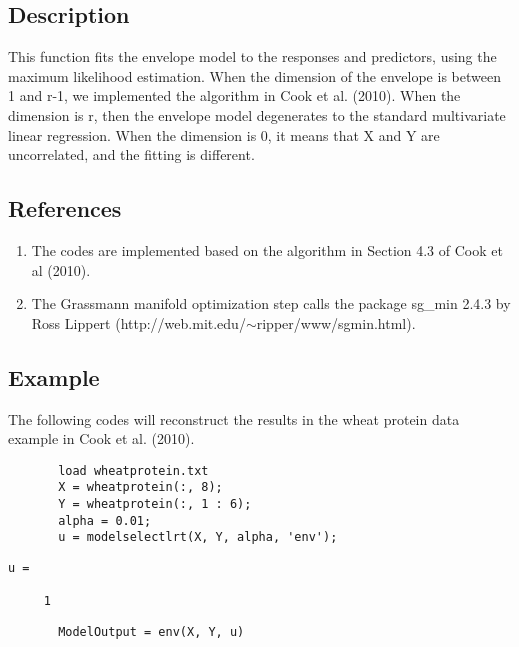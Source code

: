 \documentclass[a4paper,11pt,openany]{memoir}
\begin{document}
\subsection*{Description}

\begin{par}
This function fits the envelope model to the responses and predictors, using the maximum likelihood estimation.  When the dimension of the envelope is between 1 and r-1, we implemented the algorithm in Cook et al. (2010).  When the dimension is r, then the envelope model degenerates to the standard multivariate linear regression.  When the dimension is 0, it means that X and Y are uncorrelated, and the fitting is different.
\end{par} \vspace{1em}


\subsection*{References}

\begin{enumerate}
\setlength{\itemsep}{-1ex}
   \item The codes are implemented based on the algorithm in Section 4.3 of Cook et al (2010).
   \item The Grassmann manifold optimization step calls the package sg\_min 2.4.3 by Ross Lippert (http://web.mit.edu/$\sim$ripper/www/sgmin.html).
\end{enumerate}


\subsection*{Example}

\begin{par}
The following codes will reconstruct the results in the wheat protein data example in Cook et al. (2010).
\end{par} \vspace{1em}

\begin{verbatim}       load wheatprotein.txt
       X = wheatprotein(:, 8);
       Y = wheatprotein(:, 1 : 6);
       alpha = 0.01;
       u = modelselectlrt(X, Y, alpha, 'env');
\end{verbatim}    
        \color{lightgray}\ttfamily \begin{verbatim}
u =

     1
\end{verbatim} \rmfamily
\color{black}
       \begin{verbatim}
       ModelOutput = env(X, Y, u)
\end{verbatim}    
\end{document}
